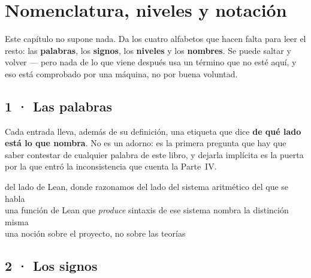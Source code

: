 \chapter*{Nomenclatura, niveles y notación}

Este capítulo no supone nada. Da los cuatro alfabetos que hacen falta para leer el resto: las
\textbf{palabras}, los \textbf{signos}, los \textbf{niveles} y los \textbf{nombres}. Se puede
saltar y volver — pero nada de lo que viene después usa un término que no esté aquí, y eso está
comprobado por una máquina, no por buena voluntad.

\section*{1 · Las palabras}

Cada entrada lleva, además de su definición, una etiqueta que dice \textbf{de qué lado está lo que
nombra}. No es un adorno: es la primera pregunta que hay que saber contestar de cualquier palabra de
este libro, y dejarla implícita es la puerta por la que entró la inconsistencia que cuenta la
Parte~IV.

\begin{center}\footnotesize
{} del lado de Lean, donde razonamos\quad
{} del lado del sistema aritmético del que se habla\\[0.35em]
 una función de Lean que \emph{produce} sintaxis de ese sistema\quad
{} nombra la distinción misma\\[0.35em]
 una noción sobre el proyecto, no sobre las teorías
\end{center}



\section*{2 · Los signos}


